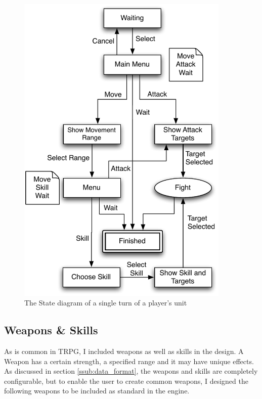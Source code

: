 
\begin{figure}[h]
	\centering
		\includegraphics[width=4in]{figures/unit.pdf}
	\caption{The State diagram of a single turn of a player's unit}
	\label{fig:figures_unit}
\end{figure}

\clearpage
\subsection{Weapons \& Skills}
\label{sub:weapons___skills}



As is common in TRPG, I included weapons as  well as skills in the design.  A Weapon has a certain strength, a specified range and it may have unique effects.  As discussed in  section \ref{ssub:data_format},  the weapons and skills are completely configurable, but to enable the user to create common weapons, I designed the following weapons to be included as standard in the engine.  

